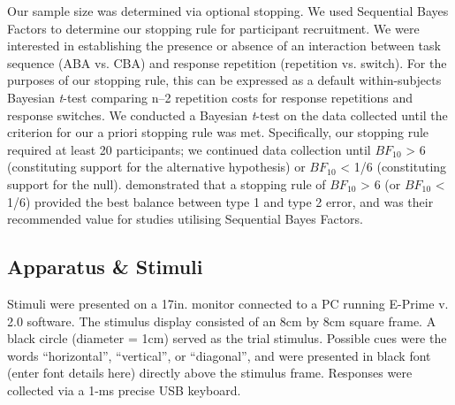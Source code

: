 \documentclass[a4paper, doc, natbib]{apa6}
\begin{document}
Our sample size was determined via optional stopping. We used Sequential Bayes Factors \citep{Schoenbrodtinpress} to determine our stopping rule for participant recruitment. We were interested in establishing the presence or absence of an interaction between task sequence (ABA vs. CBA) and response repetition (repetition vs. switch). For the purposes of our stopping rule, this can be expressed as a default within-subjects Bayesian \emph{t}-test \citep{Rouder2009} comparing n--2 repetition costs for response repetitions and response switches.  We conducted a Bayesian \emph{t}-test on the data collected until the criterion for our a priori stopping rule was met. Specifically, our stopping rule required at least 20 participants; we continued data collection until $BF_{10}$ > 6 (constituting support for the alternative hypothesis) or $BF_{10}$ < 1/6 (constituting support for the null). \cite{Schoenbrodtinpress} demonstrated that a stopping rule of $BF_{10}$ > 6 (or $BF_{10}$ < 1/6) provided the best balance between type 1 and type 2 error, and was their recommended value for studies utilising Sequential Bayes Factors. 

\subsection{Apparatus \& Stimuli}
Stimuli were presented on a 17in. monitor connected to a PC running E-Prime v. 2.0 software. The stimulus display consisted of an 8cm by 8cm square frame. A black circle (diameter = 1cm) served as the trial stimulus. Possible cues were the words ``horizontal'', ``vertical'', or ``diagonal'', and were presented in black font (enter font details here) directly above the stimulus frame. Responses were collected via a 1-ms precise USB keyboard.
\end{document}
